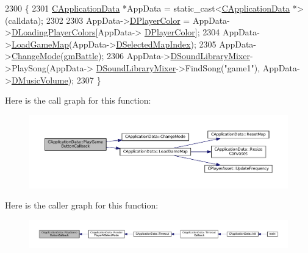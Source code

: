 \begin{DoxyCode}
2300                                                            \{
2301     \hyperlink{classCApplicationData}{CApplicationData} *AppData = \textcolor{keyword}{static\_cast<}\hyperlink{classCApplicationData}{CApplicationData} *\textcolor{keyword}{>}(calldata);
2302     
2303     AppData->\hyperlink{classCApplicationData_a53550939b20cba70570f113e4d1c5d02}{DPlayerColor} = AppData->\hyperlink{classCApplicationData_ab29b80d90f1201608dcb498cd627a6f9}{DLoadingPlayerColors}[AppData->
      \hyperlink{classCApplicationData_a53550939b20cba70570f113e4d1c5d02}{DPlayerColor}];
2304     AppData->\hyperlink{classCApplicationData_a89af0c7917be766575720e5ac79c8d2d}{LoadGameMap}(AppData->\hyperlink{classCApplicationData_a279cfd90004e3f1b90b119358ff25586}{DSelectedMapIndex});
2305     AppData->\hyperlink{classCApplicationData_aee18c113e9a0acb3cad3d63eb19de71b}{ChangeMode}(\hyperlink{classCApplicationData_ac8ac37a4c8bb871036fbbdc6a072e403a00a1759bd54eaaa07aab7575dbae51fc}{gmBattle});
2306     AppData->\hyperlink{classCApplicationData_aa1e6876121bb4fb229ec6b930a8a6766}{DSoundLibraryMixer}->PlaySong(AppData->
      \hyperlink{classCApplicationData_aa1e6876121bb4fb229ec6b930a8a6766}{DSoundLibraryMixer}->FindSong(\textcolor{stringliteral}{"game1"}), AppData->\hyperlink{classCApplicationData_a8bc61af4a83a667102e55cca2a739c3b}{DMusicVolume});
2307 \}
\end{DoxyCode}
Here is the call graph for this function\+:\nopagebreak
\begin{figure}[H]
\begin{center}
\leavevmode
\includegraphics[width=350pt]{classCApplicationData_a659aa43022e92610c2f8cc182eab1b8e_cgraph}
\end{center}
\end{figure}
Here is the caller graph for this function\+:\nopagebreak
\begin{figure}[H]
\begin{center}
\leavevmode
\includegraphics[width=350pt]{classCApplicationData_a659aa43022e92610c2f8cc182eab1b8e_icgraph}
\end{center}
\end{figure}
\hypertarget{classCApplicationData_a10e56e4604f1f0823af659a7989fea9d}{}\label{classCApplicationData_a10e56e4604f1f0823af659a7989fea9d} 

